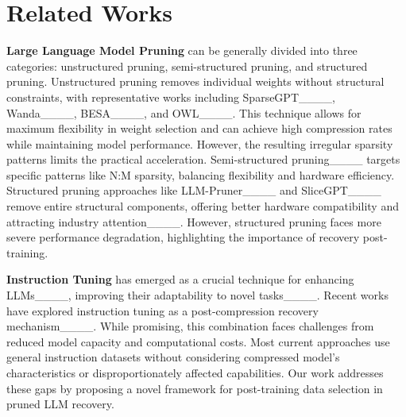\section{Related Works}
\textbf{Large Language Model Pruning} can be generally divided into three categories: unstructured pruning, semi-structured pruning, and structured pruning. Unstructured pruning removes individual weights without structural constraints, with representative works including SparseGPT____, Wanda____, BESA____, and OWL____. This technique allows for maximum flexibility in weight selection and can achieve high compression rates while maintaining model performance. However, the resulting irregular sparsity patterns limits the practical acceleration. 
Semi-structured pruning____ targets specific patterns like N:M sparsity, balancing flexibility and hardware efficiency. Structured pruning approaches like LLM-Pruner____ and SliceGPT____ remove entire structural components, offering better hardware compatibility and attracting industry attention____. However, structured pruning faces more severe performance degradation, highlighting the importance of recovery post-training.

\textbf{Instruction Tuning} has emerged as a crucial technique for enhancing LLMs____, improving their adaptability to novel tasks____. Recent works have explored instruction tuning as a post-compression recovery mechanism____. While promising, this combination faces challenges from reduced model capacity and computational costs. Most current approaches use general instruction datasets without considering compressed model's characteristics or disproportionately affected capabilities. Our work addresses these gaps by proposing a novel framework for post-training data selection in pruned LLM recovery.